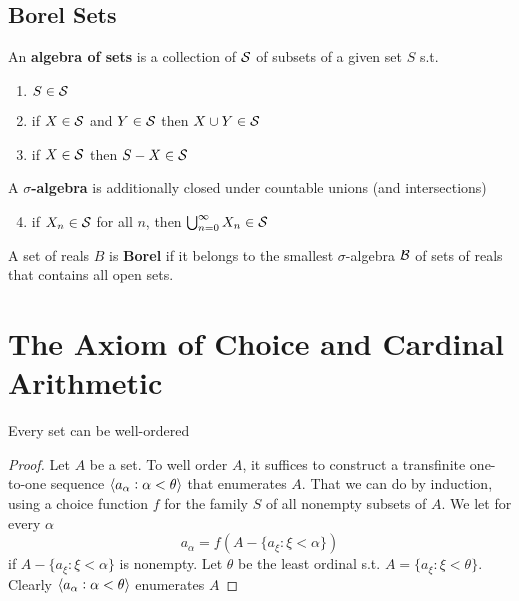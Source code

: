 \documentclass[11pt]{article}
\begin{document}
\subsection{Borel Sets}
\label{sec:orgf6afc67}
\begin{definition}[]
An \textbf{algebra of sets} is a collection of \(\mathcal{S}\) of subsets of a given set \(S\)
s.t.
\begin{enumerate}
\item \(S\in\mathcal{S}\)
\item if \(X\in\mathcal{S}\) and \(Y\in\mathcal{S}\) then \(X\cup Y\in\mathcal{S}\)
\item if \(X\in\mathcal{S}\) then \(S-X\in\mathcal{S}\)
\end{enumerate}


A \textbf{\(\sigma\)-algebra} is additionally closed under countable unions (and
intersections)
\begin{enumerate}
\setcounter{enumi}{3}
\item if \(X_n\in\mathcal{S}\) for all \(n\), then \(\bigcup_{n=0}^\infty X_n\in\mathcal{S}\)
\end{enumerate}
\end{definition}

\begin{definition}[]
A set of reals \(B\) is \textbf{Borel} if it belongs to the smallest \(\sigma\)-algebra
\(\mathcal{B}\) of sets of reals that contains all open sets.
\end{definition}

\section{The Axiom of Choice and Cardinal Arithmetic}
\label{sec:org884ad83}
\begin{theorem}
\label{thm5.1}
Every set can be well-ordered
\end{theorem}

\begin{proof}
Let \(A\) be a set. To well order \(A\), it suffices to construct a transfinite
one-to-one sequence \(\langle a_\alpha:\alpha<\theta\rangle\) that enumerates \(A\). That we can
do by induction, using a choice function \(f\) for the family \(S\) of all nonempty
subsets of \(A\). We let for every \(\alpha\) 
\begin{equation*}
a_\alpha=f(A-\{a_\xi:\xi<\alpha\})
\end{equation*}
if \(A-\{a_\xi:\xi<\alpha\}\) is nonempty. Let \(\theta\) be the least ordinal s.t.
\(A=\{a_\xi:\xi<\theta\}\). Clearly \(\langle a_\alpha:\alpha<\theta\rangle\) enumerates \(A\)
\end{proof}
\end{document}
